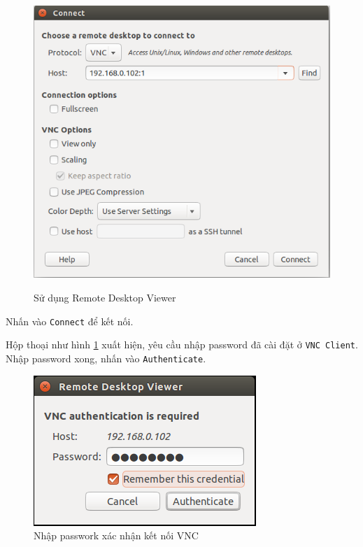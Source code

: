 \begin{list}{--}{}
\begin{list}{+}{}
\begin{figure}[!h]
\begin{center}
	{\includegraphics[scale=.35]{remote/images/VNC-2}}
\end{center}
\caption{Sử dụng \textsf{Remote Desktop Viewer}}
\end{figure}
\item Nhấn vào \verb|Connect| để kết nối.
\item Hộp thoại như hình \ref{Fig:VNC-3} xuất hiện, yêu cầu nhập password đã cài đặt ở \verb|VNC Client|. Nhập password xong, nhấn vào \verb|Authenticate|.
\begin{figure}[!h]
\begin{center}
\includegraphics[scale=.45]{remote/images/VNC-3}
\end{center}
\caption{Nhập passwork xác nhận kết nối VNC}\label{Fig:VNC-3}
\end{figure}
\end{list}
\end{list}
